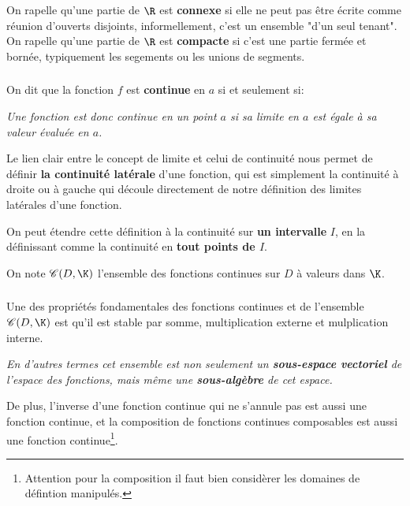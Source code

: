 \chapter*{} %

On rapelle qu'une partie de \(\R\) est \textbf{connexe} si elle ne peut pas être écrite comme réunion d'ouverts disjoints, informellement, c'est un ensemble "d'un seul tenant".\+
On rapelle qu'une partie de \(\R\) est \textbf{compacte} si c'est une partie fermée et bornée, typiquement les segements ou les unions de segments.

\subsection*{}

On dit que la fonction \(f\) est \textbf{continue} en \(a\) si et seulement si:
\begin{center}
   \textit{
      Une fonction est donc continue en un point \(a\) si sa limite en \(a\) est égale à sa valeur évaluée en \(a\).
   }
\end{center}
Le lien clair entre le concept de limite et celui de continuité nous permet de définir \textbf{la continuité latérale} d'une fonction, qui est simplement la continuité à droite ou à gauche qui découle directement de notre définition des limites latérales d'une fonction.\<

On peut étendre cette définition à la continuité sur \textbf{un intervalle} \(I\), en la définissant comme la continuité en \textbf{tout points de \(I\)}.\+

On note \(\mathscr{C}(D, \K)\) l'ensemble des fonctions continues sur \(D\) à valeurs dans \(\K\).

\subsection*{}

Une des propriétés fondamentales des fonctions continues et de l'ensemble \(\mathscr{C}(D, \K)\) est qu'il est stable par somme, multiplication externe et mulplication interne.
\begin{center}
   \textit{
      En d'autres termes cet ensemble est non seulement un \textbf{sous-espace vectoriel} de l'espace des fonctions, mais même une \textbf{sous-algèbre} de cet espace.
   }
\end{center}
De plus, l'inverse d'une fonction continue qui ne s'annule pas est aussi une fonction continue, et la composition de fonctions continues composables est aussi une fonction continue\footnote[1]{
   Attention pour la composition il faut bien considèrer les domaines de défintion manipulés.}.

